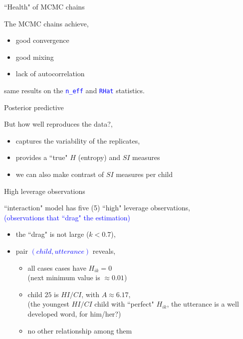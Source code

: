 %
%
\begin{lhframe}[rhgraphic={\texttt{[image: chains\_real2.pdf]}}]
	{``Health" of MCMC chains}
	
	The MCMC chains achieve,
	\begin{itemize}
		\item good convergence
		\item good mixing
		\item lack of autocorrelation
	\end{itemize}
	
	same results on the \textcolor{blue}{ \texttt{n\_eff} } and \textcolor{blue}{ \texttt{RHat} } statistics.
\end{lhframe}
%
%
\begin{lhframe}[rhgraphic={\texttt{[image: posterior\_predictive\_real.pdf]}}]
	{Posterior predictive}
	
	But how well reproduces the data?,
	\begin{itemize}
		\item captures the variability of the replicates,
		\item provides a ``true" $H$ (entropy) and $SI$ measures
		\item we can also make contrast of $SI$ measures per child
	\end{itemize}
\end{lhframe}
%
%
\begin{lhframe}[rhgraphic={\texttt{[image: outliers.pdf]}}]
	{High leverage observations}
	
	``interaction" model has five (5) ``high" leverage observations, \\
	{\small \textcolor{blue}{(observations that ``drag" the estimation)} }
	\begin{itemize}
		\item the ``drag" is not large ($k<0.7$),
		\item pair \textcolor{blue}{$(child, utterance)$} reveals,
		\begin{itemize}
			\item all cases cases have $H_{ik}=0$ \\
			{\small (next minimum value is $\approx 0.01$)}
			\item child $25$ is $HI/CI$, with $A \approx 6.17$, \\
			{\small (the youngest $HI/CI$ child with ``perfect" $H_{ik}$, the utterance is a well developed word, for him/her?)}
			\item no other relationship among them
		\end{itemize}
	\end{itemize}
\end{lhframe}
%
%
